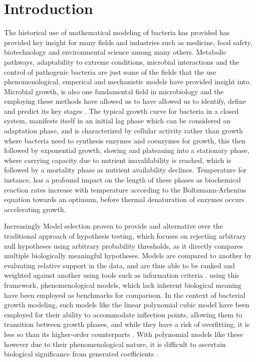 \documentclass[11pt]{article}
\begin{document}
\pagebreak

\section{Introduction}
The historical use of mathematical modeling of bacteria has provided has provided key insight for many fields and industries such as medicine, food safety, biotechnology and environmental science among many others. Metabolic pathways, adaptability to  extreme conditions, microbial interactions and the control of pathogenic bacteria are just some of the fields that the use phenomenological, emperical and mechanistic models have provided insight into. Microbial growth, is also one fundamental field in microbiology and the employing these methods have allowed us to have allowed us to identify, define and predict its key stages \cite{esser2015modeling}. The typical growth curve for bacteria in a closed system, manifests itself in an initial lag phase which can be considered an adaptation phase, and is characterized by cellular activity rather than growth where bacteria need to synthesis enzymes and coenzymes for growth, this then followed by exponential growth, slowing and plateauing into a stationary phase, where carrying capacity due to nutrient inavalilability is reached, which is followed by a mortality phase as nutrient availability declines\cite{Peleg01122011,maier2015bacterial,lo2023generalized}. Temperature for instance, has a profound impact on the length of these phases as biochemical reaction rates increase with temperature according to the Boltzmann-Arhenius equation towards an optimum, before thermal denaturation of enzymes occurs \cite{michaelis1913kinetik, zwietering1994modeling, dell2011systematic} accelerating growth.   
\setlength{\parskip}{1.2em} %

Increasingly Model selection proven to provide and alternative over the traditional approach of hypothesis testing, which focuses on rejecting arbitrary null hypotheses using arbitrary probability thresholds, as it directly compares multiple biologically meaningful hypotheses. Models are compared to another by evaluating relative support in the data, and are thus able to be ranked and weighted against another using tools such as information criteria \cite{johnson2004model}. using this framework, phenomenological models, which lack inherent biological meaning have been employed as benchmarks for comparison. In the context of bacterial growth modeling, such models like the linear polynomial cubic model have been employed for their ability to accommodate inflection points, allowing them to transition between growth phases, and while they have a risk of overfitting, it is less so than its higher-order counterparts \cite{garcia2021primary}. With polynomial models like these however due to their phenomenological nature, it is difficult to ascertain biological significance from generated coefficients \cite{Peleg01122011,motulsky2004fitting}.   
\end{document}
